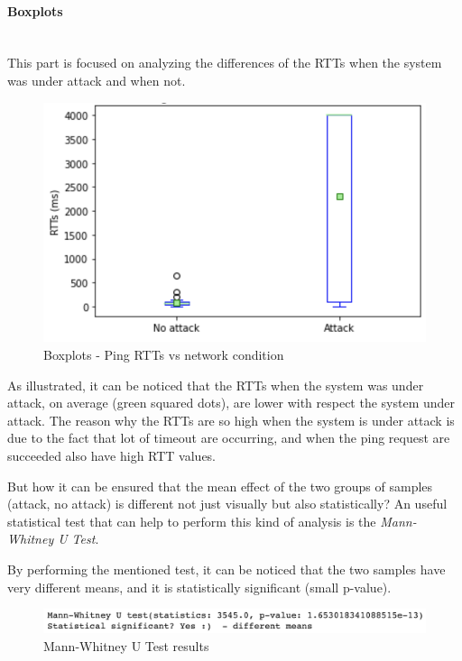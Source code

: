 \documentclass[fleqn, 11pt]{SelfArx} %
\begin{document}
\paragraph{Boxplots}\mbox{}\\
This part is focused on analyzing the differences of the RTTs when the system was under attack and when not.

\begin{figure}[H]\centering
    \includegraphics[width=\linewidth]{./ping/ping-boxplot1.png}
    \caption{Boxplots - Ping RTTs vs network condition}
\end{figure}

As illustrated, it can be noticed that the RTTs when the system was under attack, on average (green squared dots), are lower with respect the system under attack.
The reason why the RTTs are so high when the system is under attack is due to the fact that lot of timeout are occurring, and when the ping request are 
succeeded also have high RTT values.

But how it can be ensured that the mean effect of the two groups of samples (attack, no attack) is different not just visually but also statistically?
An useful statistical test that can help to perform this kind of analysis is the {\it{Mann-Whitney U Test}}.

By performing the mentioned test, it can be noticed that the two samples have very different means, and it is statistically significant (small p-value).

\begin{figure}[H]\centering
    \includegraphics[width=\linewidth]{./ping/mannwhitneyu1.png}
    \caption{Mann-Whitney U Test results}
	\label{fig:mannwhitneyu1}
\end{figure}
\end{document}
